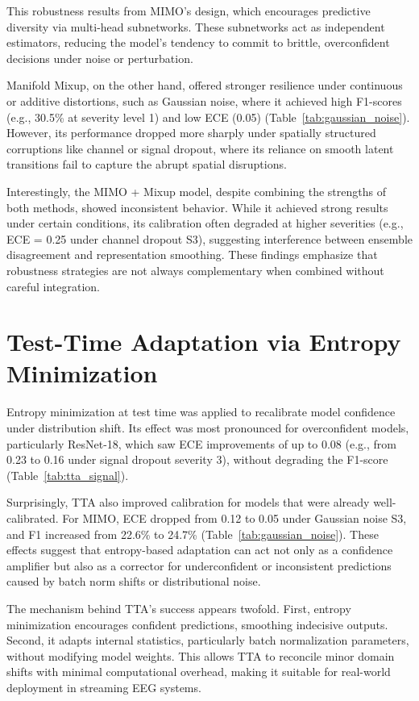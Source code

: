 This robustness results from MIMO’s design, which encourages predictive diversity via multi-head subnetworks. These subnetworks act as independent estimators, reducing the model’s tendency to commit to brittle, overconfident decisions under noise or perturbation.

Manifold Mixup, on the other hand, offered stronger resilience under continuous or additive distortions, such as Gaussian noise, where it achieved high F1-scores (e.g., 30.5\% at severity level 1) and low ECE (0.05) (Table~\ref{tab:gaussian_noise}). However, its performance dropped more sharply under spatially structured corruptions like channel or signal dropout, where its reliance on smooth latent transitions fail to capture the abrupt spatial disruptions.

Interestingly, the MIMO + Mixup model, despite combining the strengths of both methods, showed inconsistent behavior. While it achieved strong results under certain conditions, its calibration often degraded at higher severities (e.g., ECE = 0.25 under channel dropout S3), suggesting interference between ensemble disagreement and representation smoothing. These findings emphasize that robustness strategies are not always complementary when combined without careful integration.

\section{Test-Time Adaptation via Entropy Minimization}
Entropy minimization at test time was applied to recalibrate model confidence under distribution shift. Its effect was most pronounced for overconfident models, particularly ResNet-18, which saw ECE improvements of up to 0.08 (e.g., from 0.23 to 0.16 under signal dropout severity 3), without degrading the F1-score (Table~\ref{tab:tta_signal}).

Surprisingly, TTA also improved calibration for models that were already well-calibrated. For MIMO, ECE dropped from 0.12 to 0.05 under Gaussian noise S3, and F1 increased from 22.6\% to 24.7\% (Table~\ref{tab:gaussian_noise}). These effects suggest that entropy-based adaptation can act not only as a confidence amplifier but also as a corrector for underconfident or inconsistent predictions caused by batch norm shifts or distributional noise.

The mechanism behind TTA’s success appears twofold. First, entropy minimization encourages confident predictions, smoothing indecisive outputs. Second, it adapts internal statistics, particularly batch normalization parameters, without modifying model weights. This allows TTA to reconcile minor domain shifts with minimal computational overhead, making it suitable for real-world deployment in streaming EEG systems.

